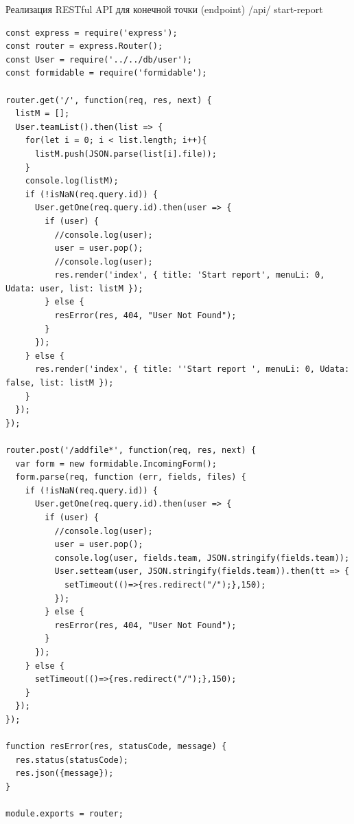 Реализация RESTful API для конечной точки (endpoint) /api/ start-report

\begin{lstlisting}
const express = require('express');
const router = express.Router();
const User = require('../../db/user');
const formidable = require('formidable');

router.get('/', function(req, res, next) {
  listM = [];
  User.teamList().then(list => {
    for(let i = 0; i < list.length; i++){
      listM.push(JSON.parse(list[i].file));
    }
    console.log(listM);
    if (!isNaN(req.query.id)) {
      User.getOne(req.query.id).then(user => {
        if (user) {
          //console.log(user);
          user = user.pop();
          //console.log(user);
          res.render('index', { title: 'Start report', menuLi: 0, Udata: user, list: listM });
        } else {
          resError(res, 404, "User Not Found");
        }
      });
    } else {
      res.render('index', { title: ''Start report ', menuLi: 0, Udata: false, list: listM });
    }
  });
});

router.post('/addfile*', function(req, res, next) {
  var form = new formidable.IncomingForm();
  form.parse(req, function (err, fields, files) {
    if (!isNaN(req.query.id)) {
      User.getOne(req.query.id).then(user => {
        if (user) {
          //console.log(user);
          user = user.pop();
          console.log(user, fields.team, JSON.stringify(fields.team));
          User.setteam(user, JSON.stringify(fields.team)).then(tt => {
            setTimeout(()=>{res.redirect("/");},150);
          });
        } else {
          resError(res, 404, "User Not Found");
        }
      });
    } else {
      setTimeout(()=>{res.redirect("/");},150);
    }
  });
});

function resError(res, statusCode, message) {
  res.status(statusCode);
  res.json({message});
}

module.exports = router;
\end{lstlisting}